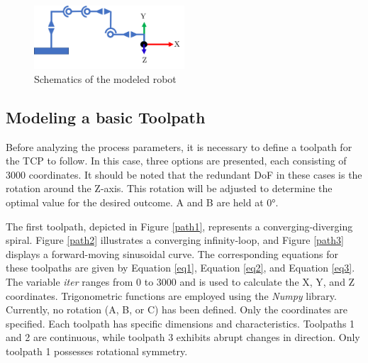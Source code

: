 \begin{figure}[H]
	\centerline{\includegraphics[width=0.5\textwidth]{figures/schema.png}}
	\caption{Schematics of the modeled robot}
	\label{schema}
\end{figure}

\subsection{Modeling a basic Toolpath}\label{MBT}
Before analyzing the process parameters, it is necessary to define a toolpath for the \acrshort{TCP} to follow. In this case, three options are presented, each consisting of 3000 coordinates. It should be noted that the redundant \acrshort{DoF} in these cases is the rotation around the Z-axis. This rotation will be adjusted to determine the optimal value for the desired outcome. A and B are held at 0°.

The first toolpath, depicted in Figure \ref{path1}, represents a converging-diverging spiral. Figure \ref{path2} illustrates a converging infinity-loop, and Figure \ref{path3} displays a forward-moving sinusoidal curve. The corresponding equations for these toolpaths are given by Equation \ref{eq1}, Equation \ref{eq2}, and Equation \ref{eq3}. The variable \textit{iter} ranges from 0 to 3000 and is used to calculate the X, Y, and Z coordinates. Trigonometric functions are employed using the \textit{Numpy} library.  Currently, no rotation (A, B, or C) has been defined. Only the coordinates are specified. Each toolpath has specific dimensions and characteristics. Toolpaths 1 and 2 are continuous, while toolpath 3 exhibits abrupt changes in direction. Only toolpath 1 possesses rotational symmetry.


